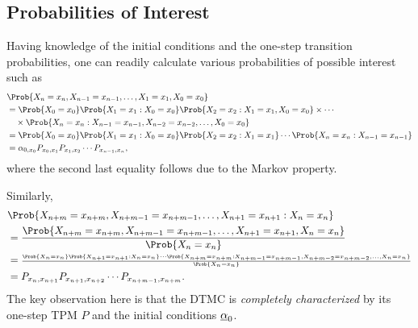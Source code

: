 \subsection*{Probabilities of Interest}
\begin{Regular}
    Having knowledge of the initial conditions and the one-step transition probabilities, one can
    readily calculate various probabilities of possible interest such as
    \begin{align*}
         & \Prob{X_{n}=x_{n}, X_{n-1}=x_{n-1}, \ldots, X_{1}=x_{1}, X_{0}=x_{0}}                                                                             \\
         & = \Prob{X_{0}=x_{0}} \Prob{X_{1}=x_{1} \given X_{0}=x_{0}} \Prob{X_{2}=x_{2} \given X_{1}=x_{1}, X_{0}=x_{0}} \times \cdots                       \\
         & \quad \times \Prob{X_{n}=x_{n} \given X_{n-1}=x_{n-1}, X_{n-2}=x_{n-2}, \ldots, X_{0}=x_{0}}                                                      \\
         & = \Prob{X_{0}=x_{0}} \Prob{X_{1}=x_{1} \given X_{0}=x_{0}} \Prob{X_{2}=x_{2} \given X_{1}=x_{1}} \cdots \Prob{X_{n}=x_{n} \given X_{n-1}=x_{n-1}} \\
         & =\alpha_{0, x_{0}} P_{x_{0}, x_{1}} P_{x_{1}, x_{2}} \cdots P_{x_{n-1}, x_{n}},
    \end{align*}
    where the second last equality follows due to the Markov property.

    Similarly,
    \begin{align*}
         & \Prob{X_{n+m}=x_{n+m}, X_{n+m-1}=x_{n+m-1}, \ldots, X_{n+1}=x_{n+1} \given X_{n}=x_{n}}                                                                                                                    \\
         & = \frac{\Prob{X_{n+m}=x_{n+m}, X_{n+m-1}=x_{n+m-1}, \ldots, X_{n+1}=x_{n+1}, X_{n}=x_{n}}}{\Prob{X_{n}=x_{n}}}                                                                                             \\
         & = {\scriptstyle\frac{\Prob{X_{n}=x_{n}} \Prob{X_{n+1}=x_{n+1} \given X_{n}=x_{n}} \cdots \Prob{X_{n+m}=x_{n+m} \given X_{n+m-1}=x_{n+m-1}, X_{n+m-2}=x_{n+m-2}, \ldots, X_{n}=x_{n}}}{\Prob{X_{n}=x_{n}}}} \\
         & = P_{x_{n}, x_{n+1}} P_{x_{n+1}, x_{n+2}} \cdots P_{x_{n+m-1}, x_{n+m}}.
    \end{align*}
    The key observation here is that the DTMC is \emph{completely characterized} by its one-step TPM
    $P$ and the initial conditions $ \underline{\alpha}_0 $.
\end{Regular}
